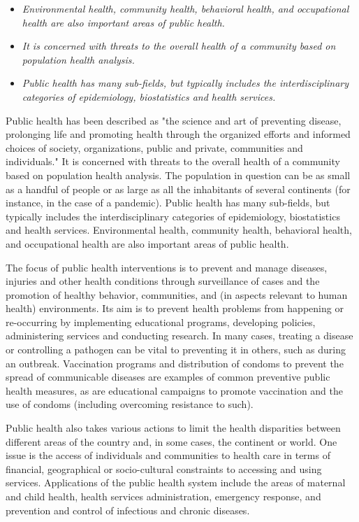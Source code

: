 \begin{itemize}
\item
  \emph{Environmental health, community health, behavioral health, and
  occupational health are also important areas of public health.}
\item
  \emph{It is concerned with threats to the overall health of a
  community based on population health analysis.}
\item
  \emph{Public health has many sub-fields, but typically includes the
  interdisciplinary categories of epidemiology, biostatistics and health
  services.}
\end{itemize}

Public health has been described as "the science and art of preventing
disease, prolonging life and promoting health through the organized
efforts and informed choices of society, organizations, public and
private, communities and individuals." It is concerned with threats to
the overall health of a community based on population health analysis.
The population in question can be as small as a handful of people or as
large as all the inhabitants of several continents (for instance, in the
case of a pandemic). Public health has many sub-fields, but typically
includes the interdisciplinary categories of epidemiology, biostatistics
and health services. Environmental health, community health, behavioral
health, and occupational health are also important areas of public
health.

The focus of public health interventions is to prevent and manage
diseases, injuries and other health conditions through surveillance of
cases and the promotion of healthy behavior, communities, and (in
aspects relevant to human health) environments. Its aim is to prevent
health problems from happening or re-occurring by implementing
educational programs, developing policies, administering services and
conducting research. In many cases, treating a disease or controlling a
pathogen can be vital to preventing it in others, such as during an
outbreak. Vaccination programs and distribution of condoms to prevent
the spread of communicable diseases are examples of common preventive
public health measures, as are educational campaigns to promote
vaccination and the use of condoms (including overcoming resistance to
such).

Public health also takes various actions to limit the health disparities
between different areas of the country and, in some cases, the continent
or world. One issue is the access of individuals and communities to
health care in terms of financial, geographical or socio-cultural
constraints to accessing and using services. Applications of the public
health system include the areas of maternal and child health, health
services administration, emergency response, and prevention and control
of infectious and chronic diseases.

